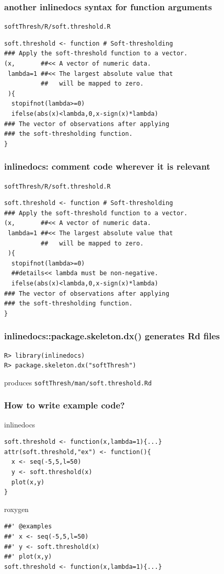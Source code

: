 \documentclass{beamer}
\begin{document}
\begin{frame}[containsverbatim]
  \frametitle{another inlinedocs syntax for function arguments}
  \texttt{softThresh/R/soft.threshold.R}
  \hrulefill
  \small
\begin{verbatim}
soft.threshold <- function # Soft-thresholding
### Apply the soft-threshold function to a vector.
(x,       ##<< A vector of numeric data.
 lambda=1 ##<< The largest absolute value that
          ##   will be mapped to zero.
 ){
  stopifnot(lambda>=0)
  ifelse(abs(x)<lambda,0,x-sign(x)*lambda)
### The vector of observations after applying 
### the soft-thresholding function.
}
\end{verbatim}
\end{frame}

\begin{frame}[containsverbatim]
  \frametitle{inlinedocs: comment code wherever it is relevant}
  \texttt{softThresh/R/soft.threshold.R}
  \hrulefill
  \small
\begin{verbatim}
soft.threshold <- function # Soft-thresholding
### Apply the soft-threshold function to a vector.
(x,       ##<< A vector of numeric data.
 lambda=1 ##<< The largest absolute value that
          ##   will be mapped to zero.
 ){
  stopifnot(lambda>=0)
  ##details<< lambda must be non-negative.
  ifelse(abs(x)<lambda,0,x-sign(x)*lambda)
### The vector of observations after applying 
### the soft-thresholding function.
}
\end{verbatim}
\end{frame}

\begin{frame}[containsverbatim]
  \frametitle{inlinedocs::package.skeleton.dx() generates Rd files}
  \begin{verbatim}
R> library(inlinedocs)
R> package.skeleton.dx("softThresh")
\end{verbatim}
  produces \texttt{softThresh/man/soft.threshold.Rd}
\end{frame}

\begin{frame}[containsverbatim]
  \frametitle{How to write example code?}
    inlinedocs
    \hrulefill
    \begin{verbatim}
soft.threshold <- function(x,lambda=1){...}
attr(soft.threshold,"ex") <- function(){
  x <- seq(-5,5,l=50)
  y <- soft.threshold(x)
  plot(x,y)
}
\end{verbatim}
    roxygen
    \hrulefill
\begin{verbatim}
##' @examples
##' x <- seq(-5,5,l=50)
##' y <- soft.threshold(x)
##' plot(x,y)
soft.threshold <- function(x,lambda=1){...}
\end{verbatim}
\end{frame}
\end{document}
